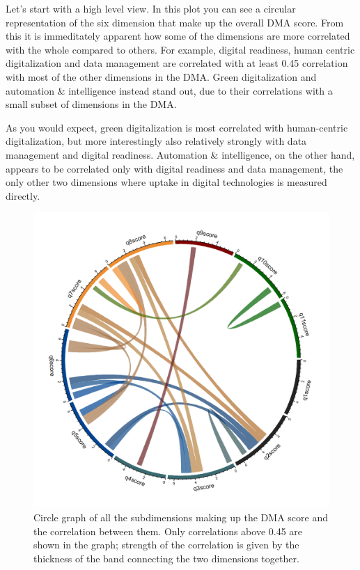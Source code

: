 \documentclass[12pt]{report}
\begin{document}
\par Let's start with a high level view. In this plot you can see a circular representation of the six dimension that make up the overall DMA score. From this it is immeditately apparent how some of the dimensions are more correlated with the whole compared to others. For example, digital readiness, human centric digitalization and data management are correlated with at least 0.45 correlation with most of the other dimensions in the DMA. Green digitalization and automation \& intelligence instead stand out, due to their correlations with a small subset of dimensions in the DMA.

\par As you would expect, green digitalization is most correlated with human-centric digitalization, but more interestingly also relatively strongly with data management and digital readiness. Automation \& intelligence, on the other hand, appears to be correlated only with digital readiness and data management, the only other two dimensions where uptake in digital technologies is measured directly.


\begin{figure}[h!]
    \centering
    \includegraphics[width=0.65\linewidth]{../Output/thesmallcorrmatrix_plot.png}
    \caption{\centering Circle graph of all the subdimensions making up the DMA score and the correlation between them. Only correlations above 0.45 are shown in the graph; strength of the correlation is given by the thickness of the band connecting the two dimensions together.}
    \label{fig:circlize_subdimension_graph}
\end{figure}
\end{document}
